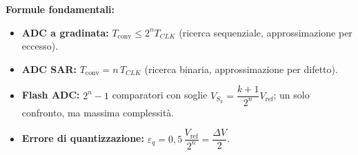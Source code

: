 \begin{note}
\textbf{Formule fondamentali:}
\begin{itemize}
    \item \textbf{ADC a gradinata:} $T_{\text{conv}} \le 2^n T_{CLK}$ (ricerca sequenziale, approssimazione per eccesso).
    \item \textbf{ADC SAR:} $T_{\text{conv}} = n\, T_{CLK}$ (ricerca binaria, approssimazione per difetto).
    \item \textbf{Flash ADC:} $2^n-1$ comparatori con soglie $V_{S_k} = \dfrac{k+1}{2^n}V_{\text{ref}}$; un solo confronto, ma massima complessità.
    \item \textbf{Errore di quantizzazione:} $\varepsilon_q = 0{,}5\,\dfrac{V_{\text{ref}}}{2^n} = \dfrac{\Delta V}{2}$.
\end{itemize}
\end{note}

